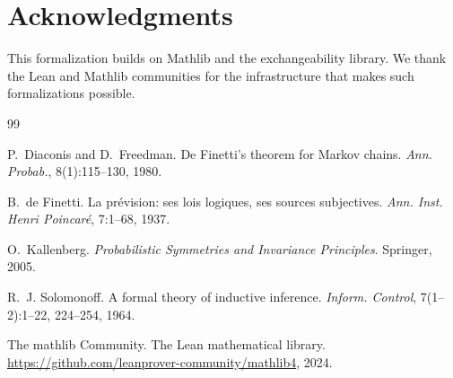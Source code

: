 \documentclass[11pt,a4paper]{article}
\theoremstyle{definition}
\begin{document}
\section*{Acknowledgments}

This formalization builds on Mathlib and the exchangeability library.
We thank the Lean and Mathlib communities for the infrastructure that
makes such formalizations possible.

\begin{thebibliography}{99}

P.~Diaconis and D.~Freedman.
\newblock De Finetti's theorem for Markov chains.
\newblock \emph{Ann. Probab.}, 8(1):115--130, 1980.

B.~de Finetti.
\newblock La pr\'evision: ses lois logiques, ses sources subjectives.
\newblock \emph{Ann. Inst. Henri Poincar\'e}, 7:1--68, 1937.

O.~Kallenberg.
\newblock \emph{Probabilistic Symmetries and Invariance Principles}.
\newblock Springer, 2005.

R.~J. Solomonoff.
\newblock A formal theory of inductive inference.
\newblock \emph{Inform. Control}, 7(1--2):1--22, 224--254, 1964.

The mathlib Community.
\newblock The Lean mathematical library.
\newblock \url{https://github.com/leanprover-community/mathlib4}, 2024.

\end{thebibliography}
\end{document}
